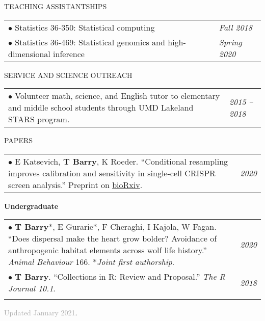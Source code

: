 \documentclass{resume} %
\begin{document}
\begin{rSection}{TEACHING ASSISTANTSHIPS}
\begin{tabular}{p{14cm}R{2.5cm}}
	$\bullet$ Statistics 36-350: Statistical computing 
	& \textit{Fall 2018} \\ 
	$\bullet$ Statistics 36-469: Statistical genomics and high-dimensional inference & \textit{Spring 2020}
\end{tabular} 

\end{rSection}

\begin{rSection}{SERVICE AND SCIENCE OUTREACH}
	\begin{tabular}{p{14cm}R{2.5cm}}
		$\bullet$ Volunteer math, science, and English tutor to elementary and middle school students through UMD Lakeland STARS program. & \it{2015 -- 2018}  \\ 
	\end{tabular} 
\end{rSection}

\begin{rSection}{PAPERS}

\begin{tabular}{p{14cm}R{2.5cm}}
	$\bullet$ E Katsevich, \textbf{T Barry}, K Roeder. ``Conditional resampling improves calibration and sensitivity in single-cell CRISPR screen analysis.'' Preprint on \href{https://www.biorxiv.org/content/10.1101/2020.08.13.250092v3}{bioRxiv}.
	 & \textit{2020} \\
\end{tabular} 

\textbf{Undergraduate}

\begin{tabular}{p{14cm}R{2.5cm}}
	$\bullet$ \textbf{T Barry}*, E Gurarie*, F Cheraghi, I Kajola, W Fagan. ``Does dispersal make the heart grow bolder? Avoidance of anthropogenic habitat elements across wolf life history.'' \textit{Animal Behaviour} 166. *\textit{Joint first authorship}. & \textit{2020}  \\
	$\bullet$ \textbf{T Barry}. ``Collections in R: Review and Proposal.'' \textit{The R Journal 10.1}. & \textit{2018} \\ &
\end{tabular} 	
\end{rSection}

\textcolor{darkgray}{Updated January 2021}.
\end{document}
